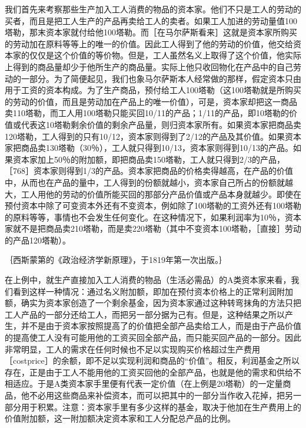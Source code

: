 我们首先来考察那些生产加入工人消费的物品的资本家。他们不只是工人的劳动的买者，而且是把工人生产的产品再卖给工人的卖者。如果工人加进的劳动量值100塔勒，那末资本家就付给他100塔勒。而［在马尔萨斯看来］这就是资本家所购买的劳动加在原料等等上的唯一的价值。因此工人得到了他的劳动的价值，他交给资本家的仅仅是这个价值的等价物。但是，工人虽然名义上取得了这个价值，他实际上得到的商品量却少于他所生产的商品量。实际上他只收回物化在产品中的自己劳动的一部分。为了简便起见，我们也象马尔萨斯本人经常做的那样，假定资本只由用于工资的资本构成。为了生产商品，预付给工人100塔勒（这100塔勒就是所购买的劳动的价值，而且是劳动加在产品上的唯一价值），可是，资本家却把这一商品卖110塔勒，而工人用100塔勒只能买回10/11的产品；1/11的产品，即10塔勒的价值或代表这10塔勒剩余价值的剩余产品量，则归资本家所有。如果资本家把商品卖120塔勒，工人得到的只有10/12，资本家则得到了2/12的产品及其价值。如果资本家把商品卖130塔勒（30％），工人就只得到10/13，资本家则得到10/13的产品。如果资本家加上50％的附加额，即把商品卖150塔勒，工人就只得到2/3的产品，［768］资本家则得到1/3的产品。资本家把商品的价格卖得越高，在产品的价值中，从而也在产品的量中，工人得到的份额就越小，资本家自己所占的份额就越大，工人用他的劳动的价值所能买回的那部分产品价值或产品本身就越少。即使在预付资本中除了可变资本外还有不变资本，例如除了100塔勒的工资外还有100塔勒的原料等等，事情也不会发生任何变化。在这种情况下，如果利润率为10％，资本家就不是把商品卖210塔勒，而是卖220塔勒（其中不变资本100塔勒，［直接］劳动的产品120塔勒）。

｛西斯蒙第的《政治经济学新原理》，于1819年第一次出版。｝

在上例中，就生产直接加入工人消费的物品（生活必需品）的A类资本家来看，我们看到这样一种情况：通过名义附加额，即加在预付资本价格上的正常利润附加额，确实为资本家创造了一个剩余基金，因为资本家通过这种转弯抹角的方法只把工人产品的一部分还给工人，而把另一部分据为己有。但是，这种结果之所以产生，并不是由于资本家按照提高了的价值把全部产品卖给工人，而是由于产品价值的提高使工人没有可能用他的工资买回全部产品，而只能买回产品的一部分。因此非常明显，工人的需求在任何时候也不足以实现购买价格超过生产费用［costprice］的余额，即不足以实现利润和商品的“价值”。相反，利润基金之所以存在，正是由于工人不能用他的工资买回他的全部产品，也就是他的需求和供给不相适应。于是A类资本家手里便有代表一定价值（在上例是20塔勒）的一定量商品，他不必用这些商品来补偿资本，而可以把其中的一部分当作收入花掉，把另一部分用于积累。注意：资本家手里有多少这样的基金，取决于他加在生产费用上的价值附加额，这一附加额决定资本家和工人分配总产品的比例。

